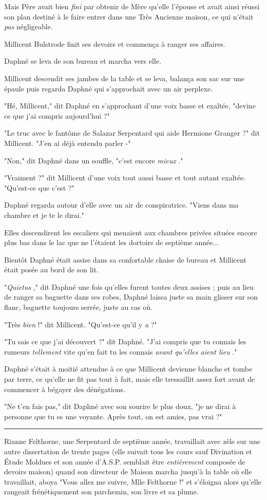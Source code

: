 Mais Père avait bien \emph{fini}  par obtenir de Mère qu'elle l'épouse et avait ainsi réussi son plan destiné à le faire entrer dans une Très Ancienne maison, ce qui n'était \emph{pas}  négligeable.

Millicent Bulstrode finit ses devoirs et commença à ranger ses affaires.

Daphné se leva de son bureau et marcha vers elle.

Millicent descendit ses jambes de la table et se leva, balança son sac sur une épaule puis regarda Daphné qui s'approchait avec un air perplexe.

"Hé, Millicent," dit Daphné en s'approchant d'une voix basse et exaltée, "devine ce que j'ai compris aujourd'hui ?"

"Le truc avec le fantôme de Salazar Serpentard qui aide Hermione Granger ?" dit Millicent. "J'en ai déjà entendu parler -"

"Non," dit Daphné dans un souffle, "c'est encore \emph{mieux} ."

"Vraiment ?" dit Millicent d'une voix tout aussi basse et tout autant exaltée. "Qu'est-ce que c'est ?"

Daphné regarda autour d'elle avec un air de conspiratrice. "Viens dans ma chambre et je te le dirai."

Elles descendirent les escaliers qui menaient aux chambres privées situées encore plus bas dans le lac que ne l'étaient les dortoirs de septième année...

Bientôt Daphné était assise dans sa confortable chaise de bureau et Millicent était posée au bord de son lit.

"\emph{Quietus} ," dit Daphné une fois qu'elles furent toutes deux assises ; puis au lieu de ranger sa baguette dans ses robes, Daphné laissa juste sa main glisser sur son flanc, baguette toujours serrée, juste au cas où.

"Très \emph{bien } !" dit Millicent. "Qu'est-ce qu'il y \emph{a } ?"

"Tu sais ce que j'ai découvert ?" dit Daphné. "J'ai compris que tu connais les rumeurs \emph{tellement } vite qu'en fait tu les connais \emph{avant qu'elles aient lieu} ."

Daphné s'était à moitié attendue à ce que Millicent devienne blanche et tombe par terre, ce qu'elle ne fit pas tout à fait, mais elle tressaillit assez fort avant de commencer à bégayer des dénégations.

"Ne t'en fais pas," dit Daphné avec son sourire le plus doux, "je ne dirai à personne que tu es une voyante. Après tout, on est amies, pas vrai ?"
\par\noindent\rule{\textwidth}{0.4pt}
Rianne Felthorne, une Serpentard de septième année, travaillait avec zèle sur une autre dissertation de trente pages (elle suivait tous les cours sauf Divination et Étude Moldues et son année d'A.S.P. semblait être \emph{entièrement}  composée de devoirs maison) quand son directeur de Maison marcha jusqu'à la table où elle travaillait, aboya "Vous allez me suivre, Mlle Felthorne !" et s'éloigna alors qu'elle rangeait frénétiquement son parchemin, son livre et sa plume.

